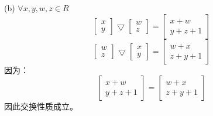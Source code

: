 \documentclass{article}
\begin{document}
(b) $\forall x, y, w, z \in R$
\[
\begin{bmatrix}
    x\\
    y
\end{bmatrix}
\bigtriangledown 
\begin{bmatrix}
    w\\
    z
\end{bmatrix}
=
\begin{bmatrix}
    x + w\\
    y + z +1
\end{bmatrix}
\]
\[
    \begin{bmatrix}
        w\\
        z
    \end{bmatrix}
    \bigtriangledown 
    \begin{bmatrix}
        x\\
        y
    \end{bmatrix}
    =
    \begin{bmatrix}
        w + x\\
        z + y +1
    \end{bmatrix}
\]
因为：
\[
    \begin{bmatrix}
        x + w\\
        y + z +1
    \end{bmatrix}
    =
    \begin{bmatrix}
        w + x\\
        z + y +1
    \end{bmatrix}
\]
因此交换性质成立。
\end{document}
